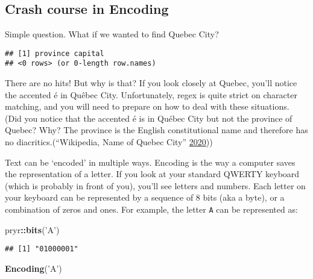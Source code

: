 \documentclass[
]{book}
\newenvironment{Shaded}{\begin{snugshade}}{\end{snugshade}}
\newcommand{\KeywordTok}[1]{\textcolor[rgb]{0.13,0.29,0.53}{\textbf{#1}}}
\newcommand{\NormalTok}[1]{#1}
\newcommand{\OperatorTok}[1]{\textcolor[rgb]{0.81,0.36,0.00}{\textbf{#1}}}
\newcommand{\StringTok}[1]{\textcolor[rgb]{0.31,0.60,0.02}{#1}}
\begin{document}
\hypertarget{crash-course-in-encoding}{%
\subsection{Crash course in Encoding}\label{crash-course-in-encoding}}

Simple question. What if we wanted to find Quebec City?

\begin{Shaded}
\end{Shaded}

\begin{verbatim}
## [1] province capital 
## <0 rows> (or 0-length row.names)
\end{verbatim}

There are no hits! But why is that? If you look closely at Quebec, you'll notice the accented é in Quêbec City. Unfortunately, regex is quite strict on character matching, and you will need to prepare on how to deal with these situations. (Did you notice that the accented é is in Québec City but not the province of Quebec? Why? The province is the English constitutional name and therefore has no diacritics.(``Wikipedia, Name of Quebec City'' \protect\hyperlink{ref-quebec}{2020}))

Text can be `encoded' in multiple ways. Encoding is the way a computer saves the representation of a letter. If you look at your standard QWERTY keyboard (which is probably in front of you), you'll see letters and numbers. Each letter on your keyboard can be represented by a sequence of 8 bits (aka a byte), or a combination of zeros and ones. For example, the letter \texttt{A} can be represented as:

\begin{Shaded}
\begin{Highlighting}[]
\NormalTok{pryr}\OperatorTok{::}\KeywordTok{bits}\NormalTok{(}\StringTok{'A'}\NormalTok{) }
\end{Highlighting}
\end{Shaded}

\begin{verbatim}
## [1] "01000001"
\end{verbatim}

\begin{Shaded}
\begin{Highlighting}[]
\KeywordTok{Encoding}\NormalTok{(}\StringTok{'A'}\NormalTok{)}
\end{Highlighting}
\end{Shaded}
\end{document}
